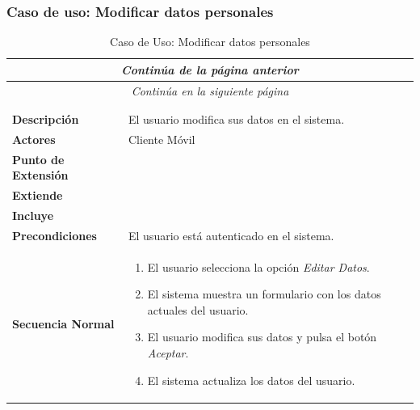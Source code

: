 \subsubsection*{Caso de uso: Modificar datos personales }
\begin{longtable}{| p{4cm} | p{10cm} |}
\endfirsthead
\multicolumn{2}{c}{\textit{Continúa de la página anterior}}\\[12pt]
\hline
\endhead
\hline
\multicolumn{2}{c}{\textit{Continúa en la siguiente página}} \\
\endfoot
\hline
\caption{Caso de Uso: Modificar datos personales}\label{fig:1}\\
\endlastfoot


\hline
\multicolumn{2}{|c|}{\textbf{CU$<$22$>$ - Modificar Datos Personales}} \\

\hline
\textbf{Descripción} &
El usuario modifica sus datos en el sistema.\\

\hline
\textbf{Actores} &
Cliente Móvil\\

\hline
\textbf{Punto de Extensión} &
\\

\hline
\textbf{Extiende} &
\\

\hline
\textbf{Incluye} &
\\

\hline
\textbf{Precondiciones} &
El usuario está autenticado en el sistema.\\

\hline
\textbf{Secuencia Normal} &\mbox{}\par\vspace{-\baselineskip}
\begin{enumerate}[leftmargin=0.7cm, topsep=0.1cm]
\item El usuario selecciona la opción \textit{Editar Datos}.
\item El sistema muestra un formulario con los datos actuales del usuario.
\item El usuario modifica sus datos y pulsa el botón \textit{Aceptar}.
\item El sistema actualiza los datos del usuario.
\end{enumerate}



\end{longtable}
